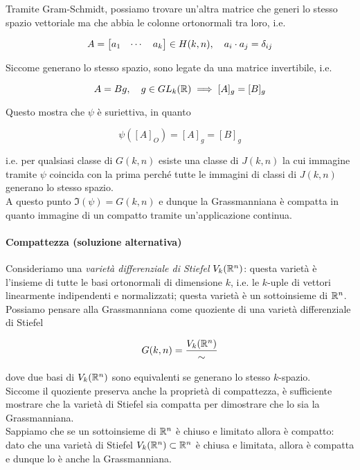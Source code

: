 {Tramite Gram-Schmidt, possiamo trovare un'altra matrice che generi lo stesso spazio vettoriale ma che abbia le colonne ortonormali tra loro, i.e.

\begin{equation}
	A = \bmqty{ a_{1} & \cdots & a_{k} } \in H(k,n) \qcomma a_{i} \cdot a_{j} = \delta_{ij}
\end{equation}

Siccome generano lo stesso spazio, sono legate da una matrice invertibile, i.e.

\begin{equation}
	A = B g \qcomma g \in GL_{k}(\R) %
	\implies %
	[A]_{g} = [B]_{g}
\end{equation}

Questo mostra che $ \psi $ è suriettiva, in quanto

\begin{equation}
	\psi([A]_{O}) = [A]_{g} = [B]_{g}
\end{equation}

i.e. per qualsiasi classe di $ G(k,n) $ esiste una classe di $ J(k,n) $ la cui immagine tramite $ \psi $ coincida con la prima perché tutte le immagini di classi di $ J(k,n) $ generano lo stesso spazio. \\
A questo punto $ \Im(\psi) = G(k,n) $ e dunque la Grassmanniana è compatta in quanto immagine di un compatto tramite un'applicazione continua.

\paragraph{Compattezza (soluzione alternativa)}

Consideriamo una \textit{varietà differenziale di Stiefel} $ V_{k}(\mathbb{R}^{n}) $: questa varietà è l'insieme di tutte le basi ortonormali di dimensione $ k $, i.e. le $ k $-uple di vettori linearmente indipendenti e normalizzati; questa varietà è un sottoinsieme di $ \mathbb{R}^{n} $. Possiamo pensare alla Grassmanniana come quoziente di una varietà differenziale di Stiefel

\begin{equation}
	G(k,n) = \dfrac{V_{k}(\mathbb{R}^{n})}{\sim}
\end{equation}

dove due basi di $ V_{k}(\mathbb{R}^{n}) $ sono equivalenti se generano lo stesso $ k $-spazio. \\
Siccome il quoziente preserva anche la proprietà di compattezza, è sufficiente mostrare che la varietà di Stiefel sia compatta per dimostrare che lo sia la Grassmanniana. \\
Sappiamo che se un sottoinsieme di $ \mathbb{R}^{n} $ è chiuso e limitato allora è compatto: dato che una varietà di Stiefel $ V_{k}(\mathbb{R}^{n}) \subset \mathbb{R}^{n} $ è chiusa e limitata, allora è compatta e dunque lo è anche la Grassmanniana.
}

